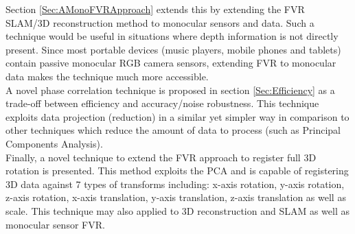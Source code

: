 Section \ref{Sec:AMonoFVRApproach} extends this by extending the FVR SLAM/3D reconstruction method to monocular sensors and data. Such a technique would be useful in situations where depth information is not directly present. Since most portable devices (music players, mobile phones and tablets) contain passive monocular RGB camera sensors, extending FVR to monocular data makes the technique much more accessible. \\

A novel phase correlation technique is proposed in section \ref{Sec:Efficiency} as a trade-off between efficiency and accuracy/noise robustness. This technique exploits data projection (reduction) in a similar yet simpler way in comparison to other techniques which reduce the amount of data to process (such as Principal Components Analysis). \\

Finally, a novel technique to extend the FVR approach to register full 3D rotation is presented. This method exploits the PCA and is capable of registering 3D data against 7 types of transforms including: x-axis rotation, y-axis rotation, z-axis rotation, x-axis translation, y-axis translation, z-axis translation as well as scale. This technique may also applied to 3D reconstruction and SLAM as well as monocular sensor FVR. \\